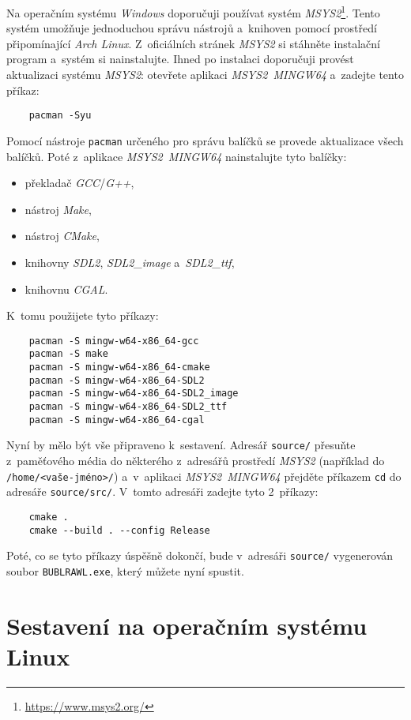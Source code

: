 Na operačním systému \emph{Windows} doporučuji používat systém \emph{MSYS2}\footnote{\url{https://www.msys2.org/}}. Tento systém umožňuje jednoduchou správu nástrojů a~knihoven pomocí prostředí připomínající \emph{Arch Linux}. Z~oficiálních stránek \emph{MSYS2} si stáhněte instalační program a~systém si nainstalujte. Ihned po instalaci doporučuji provést aktualizaci systému \emph{MSYS2}: otevřete aplikaci \emph{MSYS2~MINGW64} a~zadejte tento příkaz:
\begin{verbatim}
    pacman -Syu
\end{verbatim}
Pomocí nástroje \texttt{pacman} určeného pro správu balíčků se provede aktualizace všech balíčků. Poté z~aplikace \emph{MSYS2~MINGW64} nainstalujte tyto balíčky:
\begin{itemize}
    \item překladač \emph{GCC}/\emph{G++},
    \item nástroj \emph{Make},
    \item nástroj \emph{CMake},
    \item knihovny \emph{SDL2}, \emph{SDL2\_image} a~\emph{SDL2\_ttf},
    \item knihovnu \emph{CGAL}.
\end{itemize}
K~tomu použijete tyto příkazy:
\begin{verbatim}
    pacman -S mingw-w64-x86_64-gcc
    pacman -S make
    pacman -S mingw-w64-x86_64-cmake
    pacman -S mingw-w64-x86_64-SDL2
    pacman -S mingw-w64-x86_64-SDL2_image
    pacman -S mingw-w64-x86_64-SDL2_ttf
    pacman -S mingw-w64-x86_64-cgal
\end{verbatim}

Nyní by mělo být vše připraveno k~sestavení. Adresář \texttt{source/} přesuňte z~paměťového média do některého z~adresářů prostředí \emph{MSYS2} (například do \verb|/home/<vaše-jméno>/|) a~v~aplikaci \emph{MSYS2~MINGW64} přejděte příkazem \texttt{cd} do adresáře \texttt{source/src/}. V~tomto adresáři zadejte tyto 2~příkazy:
\begin{verbatim}
    cmake .
    cmake --build . --config Release
\end{verbatim}
Poté, co se tyto příkazy úspěšně dokončí, bude v~adresáři \texttt{source/} vygenerován soubor \texttt{BUBLRAWL.exe}, který můžete nyní spustit.

\section*{Sestavení na operačním systému Linux}

